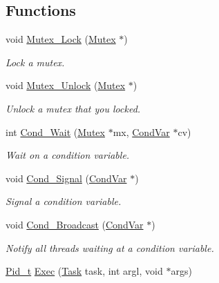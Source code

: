 \subsection*{Functions}
\begin{DoxyCompactItemize}
\item 
void \hyperlink{group__syscalls_ga1140be44df71d39edaf6a7262fb763ca}{Mutex\-\_\-\-Lock} (\hyperlink{group__syscalls_gaef2ec62cae8e0031fd19fc8b91083ade}{Mutex} $\ast$)
\begin{DoxyCompactList}\small\item\em Lock a mutex. \end{DoxyCompactList}\item 
void \hyperlink{group__syscalls_ga0b98d0315d0931d0c28104c36dd559c9}{Mutex\-\_\-\-Unlock} (\hyperlink{group__syscalls_gaef2ec62cae8e0031fd19fc8b91083ade}{Mutex} $\ast$)
\begin{DoxyCompactList}\small\item\em Unlock a mutex that you locked. \end{DoxyCompactList}\item 
int \hyperlink{group__syscalls_ga970dca2210b3f2ec8aedab7f542a9bf4}{Cond\-\_\-\-Wait} (\hyperlink{group__syscalls_gaef2ec62cae8e0031fd19fc8b91083ade}{Mutex} $\ast$mx, \hyperlink{structCondVar}{Cond\-Var} $\ast$cv)
\begin{DoxyCompactList}\small\item\em Wait on a condition variable. \end{DoxyCompactList}\item 
void \hyperlink{group__syscalls_ga43f64f8be273d2fe77d7de5f4b81e22d}{Cond\-\_\-\-Signal} (\hyperlink{structCondVar}{Cond\-Var} $\ast$)
\begin{DoxyCompactList}\small\item\em Signal a condition variable. \end{DoxyCompactList}\item 
void \hyperlink{group__syscalls_ga8196aa2a48cad90742f254cc3b8fd351}{Cond\-\_\-\-Broadcast} (\hyperlink{structCondVar}{Cond\-Var} $\ast$)
\begin{DoxyCompactList}\small\item\em Notify all threads waiting at a condition variable. \end{DoxyCompactList}\item 
\hyperlink{group__syscalls_gafac07f3170763932fac97b6eab2c3984}{Pid\-\_\-t} \hyperlink{group__syscalls_ga737ad30d8105b4b76e3eb102dd016404}{Exec} (\hyperlink{group__syscalls_ga0c7678964128d7fccc9ce98528494f4a}{Task} task, int argl, void $\ast$args)

\end{DoxyCompactItemize}
